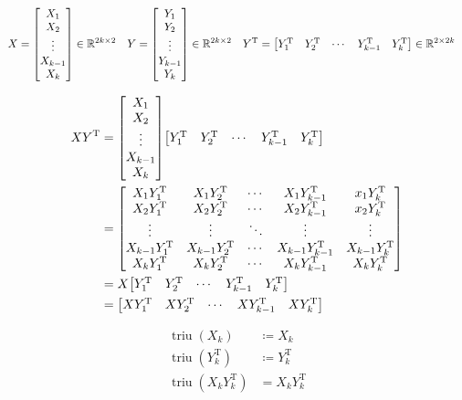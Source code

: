 \documentclass[11pt]{article}
\newcommand{\triu}{\mathop{\mathrm{triu}}}
\newcommand{\T}{\mathrm{T}}
\begin{document}
\begin{align*}
    X &= \mqty[
        X_{1} \\
        X_{2} \\
        \vdots \\
        X_{k-1} \\
        X_{k}
        ]
    \in \mathbb{R}^{2k \times 2}
    &
    Y &= \mqty[
        Y_{1} \\
        Y_{2} \\
        \vdots \\
        Y_{k-1} \\
        Y_{k}
        ]
    \in \mathbb{R}^{2k \times 2}
    &
    Y^{\T} &= \mqty[
        Y_{1}^{\T} & Y_{2}^{\T} & \cdots & Y_{k-1}^{\T} & Y_{k}^{\T}
        ] \in \mathbb{R}^{2 \times 2k}
\end{align*}



\begin{align*}
    XY^{\T} &= \mqty[
        X_{1} \\
        X_{2} \\
        \vdots \\
        X_{k-1} \\
        X_{k}
        ]
        \mqty[
        Y_{1}^{\T} & Y_{2}^{\T} & \cdots & Y_{k-1}^{\T} & Y_{k}^{\T}
        ]\\
    &= \mqty[
        X_{1} Y_{1}^{\T} & X_{1} Y_{2}^{\T} & \cdots & X_{1} Y_{k-1}^{\T} & x_{1} Y_{k}^{\T}\\
        X_{2} Y_{1}^{\T} & X_{2} Y_{2}^{\T} & \cdots & X_{2} Y_{k-1}^{\T} & x_{2} Y_{k}^{\T}\\
        \vdots & \vdots & \ddots & \vdots & \vdots\\
        X_{k-1} Y_{1}^{\T} & X_{k-1} Y_{2}^{\T} & \cdots & X_{k-1} Y_{k-1}^{\T} & X_{k-1} Y_{k}^{\T}\\
        X_{k} Y_{1}^{\T} & X_{k} Y_{2}^{\T} & \cdots & X_{k} Y_{k-1}^{\T} & X_{k} Y_{k}^{\T}
        ]\\
    &= X\mqty[
        Y_{1}^{\T} & Y_{2}^{\T} & \cdots & Y_{k-1}^{\T} & Y_{k}^{\T}
            ]\\
    &= \mqty[
        XY_{1}^{\T} & XY_{2}^{\T} & \cdots & XY_{k-1}^{\T} & XY_{k}^{\T}
        ]
\end{align*}

\begin{align*}
    \triu(X_{k}) &\coloneqq X_{k} \\
    \triu(Y_{k}^{\T}) &\coloneqq Y_{k}^{\T} \\
    \triu(X_{k} Y_{k}^{\T}) &= X_{k} Y_{k}^{\T}
\end{align*}
\end{document}
